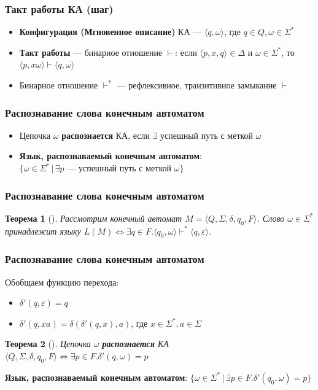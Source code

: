 \documentclass{beamer}
\newtheorem{rutheorem}{Теорема}
\begin{document}
\begin{frame}[fragile]
  \transwipe[direction=90]
  \frametitle{Такт работы КА (шаг)}
  \begin{itemize}
    \item \textbf{Конфигурация (Мгновенное описание)} КА --- $\langle q, \omega \rangle$, где $q \in Q, \omega \in \Sigma^*$
    \item \textbf{Такт работы} --- бинарное отношение $\vdash$: если $\langle p , x , q \rangle \in \Delta$ и $\omega \in \Sigma ^*$, то $\langle p , x \omega \rangle \vdash \langle q , \omega \rangle$
    \item Бинарное отношение $\vdash^*$ --- рефлексивное, транзитивное замыкание $\vdash$
  \end{itemize}
\end{frame}

\begin{frame}[fragile]
  \transwipe[direction=90]
  \frametitle{Распознавание слова конечным автоматом}
  \begin{itemize}
    \item Цепочка $\omega$ \textbf{распознается} КА, если $\exists$ успешный путь с меткой $\omega$

    \item \textbf{Язык, распознаваемый конечным автоматом}: \\ $\{ \omega \in \Sigma^* \, | \, \exists p$ --- успешный путь с меткой $\omega \}$
  \end{itemize}
\end{frame}


\begin{frame}[fragile]
  \transwipe[direction=90]
  \frametitle{Распознавание слова конечным автоматом}
  \begin{rutheorem}[]
   Рассмотрим конечный автомат  $M = \langle Q , \Sigma , \delta , q_0 , F \rangle$. 
   Слово $\omega \in \Sigma ^*$ принадлежит языку $L(M) \Leftrightarrow \exists q \in F.\langle q_0 , \omega \rangle \vdash^* \langle q , \varepsilon \rangle$.
  \end{rutheorem}  
\end{frame} 
  
\begin{frame}[fragile]
  \transwipe[direction=90]
  \frametitle{Распознавание слова конечным автоматом}
   Обобщаем функцию перехода:
 
      \begin{itemize}
        \item $\delta' (q, \varepsilon) = q$
        \item $\delta' (q, xa) = \delta(\delta'(q, x), a)$, где $x \in \Sigma^*, a \in \Sigma$
      \end{itemize}

  \begin{rutheorem}[]   
     Цепочка $\omega$ \textbf{распознается} КА $\langle Q, \Sigma, \delta, q_0, F \rangle \Leftrightarrow \exists p \in F. \delta'(q, \omega) = p$
  \end{rutheorem}  
   
   \textbf{Язык, распознаваемый конечным автоматом}: $\{ \omega \in \Sigma^* \, | \, \exists p \in F.\delta'(q_0, \omega) = p \}$
\end{frame}
\end{document}
